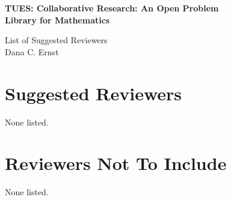 \documentclass[11pt]{article}
\begin{document}
\begin{center}
{\Large \textbf{TUES: Collaborative Research: An Open Problem\\
Library for Mathematics}}

\bigskip

{\Large List of Suggested Reviewers}\\
\smallskip
Dana C. Ernst
\end{center}

\section{Suggested Reviewers}

None listed.

\section{Reviewers Not To Include}

None listed.
\end{document}
